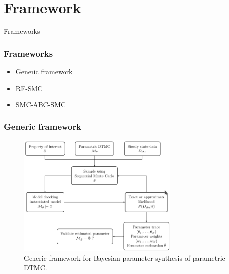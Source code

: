 \documentclass{beamer}
\begin{document}
\section{Framework}
\begin{frame}
    \begin{center}
        \Huge Frameworks
    \end{center}
\end{frame}

\begin{frame}
    \frametitle{Frameworks}
    \begin{itemize}
        \item Generic framework
        \item RF-SMC
        \item SMC-ABC-SMC
    \end{itemize}
\end{frame}

\begin{frame}
    \frametitle{Generic framework}
    \begin{figure}[H]
        \centering
        \includegraphics[width=0.7\textwidth]{figures/bbeess-framework.png}
        \caption{Generic framework for Bayesian parameter synthesis of parametric DTMC.}
        \label{fig:generic-framework}
    \end{figure}
\end{frame}
\end{document}
